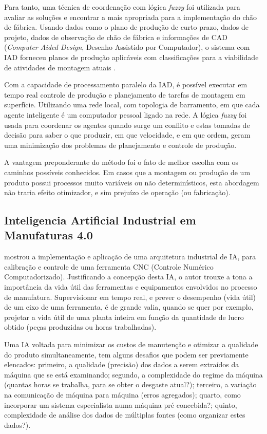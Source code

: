 \documentclass[
	article,			    %
	12pt,				    %
	oneside,			    %
	a4paper,			    %
	chapter=TITLE,		    %
	section=TITLE,		    %
	subsection=TITLE,	    %
	english,			    %
	brazil,				    %
	sumario=tradicional
]{abntex2}
\begin{document}
Para tanto, uma técnica de coordenação com lógica \emph{fuzzy} foi utilizada para avaliar as soluções e encontrar a mais apropriada para a implementação do chão de fábrica. Usando dados como o plano de produção de curto prazo, dados de projeto, dados de observação de chão de fábrica e informações de CAD (\emph{Computer Aided Design}, Desenho Assistido por Computador), o sistema com IAD forneceu planos de produção aplicáveis com classificações para a viabilidade de atividades de montagem atuais \cite{SHIH1995199}.

Com a capacidade de processamento paralelo da IAD, é possível executar em tempo real controle de produção e planejamento de tarefas de montagem em superfície. Utilizando uma rede local, com topologia de barramento, em que cada agente inteligente é um computador pessoal ligado na rede. A lógica \emph{fuzzy} foi usada para coordenar os agentes quando surge um conflito e estas tomadas de decisão para saber o que produzir, em que velocidade, e em que ordem, geram uma minimização dos problemas de planejamento e controle de produção.

A vantagem preponderante do método foi o fato de melhor escolha com os caminhos possíveis conhecidos. Em casos que a montagem ou produção de um produto possui processos muito variáveis ou não determinísticos, esta abordagem não traria efeito otimizador, e sim prejuízo de operação (ou fabricação).

\subsection{Inteligencia Artificial Industrial em Manufaturas 4.0}
 mostrou a implementação e aplicação de uma arquitetura industrial de IA, para calibração e controle de uma ferramenta CNC (Controle Numérico Computadorizado). Justificando a concepção desta IA, o autor trouxe a tona a importância da vida útil das ferramentas e equipamentos envolvidos no processo de manufatura. Supervisionar em tempo real, e prever o desempenho (vida útil) de um eixo de uma ferramenta, é de grande valia, quando se quer por exemplo, projetar a vida útil de uma planta inteira em função da quantidade de lucro obtido (peças produzidas ou horas trabalhadas).

Uma IA voltada para minimizar os custos de manutenção e otimizar a qualidade do produto simultaneamente, tem alguns desafios que podem ser previamente elencados: primeiro, a qualidade (precisão) dos dados a serem extraídos da máquina que se está examinando; segundo, a complexidade do regime da máquina (quantas horas se trabalha, para se obter o desgaste atual?); terceiro, a variação na comunicação de máquina para máquina (erros agregados); quarto, como incorporar um sistema especialista numa máquina pré concebida?; quinto, complexidade de análise dos dados de múltiplas fontes (como organizar estes dados?).
\end{document}
